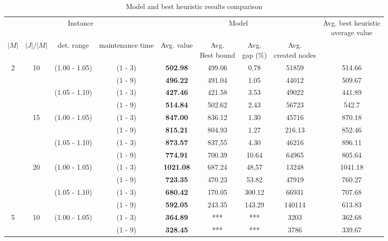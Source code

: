 \documentclass[a4paper,11pt]{article}
\begin{document}
\begin{table}[!ht]
\caption{Model and best heuristic results comparison}
\tiny
\centering
\begin{tabular}{|c|c|c|c|c|c|c |c|c|}
\hline

\multicolumn{4}{|c|}{Instance} & \multicolumn{4}{|c|}{Model}  & \makecell{Avg. best heuristic \\ average value}  \\
\cline{1-8}
$|M|$ & $|J|/|M|$ & det. range & maintenance time & Avg. value& \makecell{Avg.\\ Best bound} & \makecell{Avg. \\gap (\%)} & \makecell {Avg. \\ created nodes} &  \\
\hline

2 & 10 & (1.00 - 1.05) & (1 - 3) & 			  \textbf{502.98}  & 499.06 & 0,78 & 51859 &  514.66 \\
  &    &  & (1 - 9) & 						  \textbf{496.22} & 491.04 & 1.05  & 44012&  509.67 \\
  &    & (1.05 - 1.10) & (1 - 3) & 			  \textbf{427.46} & 421.58 & 3.53 & 49022 &  441.89 \\
  &    &  & (1 - 9) & 						  \textbf{514.84} & 502.62 & 2.43 & 56723 &  542.7 \\
  & 15 & (1.00 - 1.05) & (1 - 3) & 			  \textbf{847.00} & 836.12 & 1.30 & 45716 &  870.18 \\
  &    &               & (1 - 9) & 			  \textbf{815.21} & 804.93 & 1.27 & 216.13 & 852.46 \\
  &    & (1.05 - 1.10) & (1 - 3) &  		  \textbf{873.57} & 837,55 & 4.30 & 46216& 896.11 \\ 
  &    &  & (1 - 9) & 						  \textbf{774.91} & 700.39 & 10.64 & 64965 & 805.64 \\ 
  & 20 & (1.00 - 1.05) & (1 - 3) & 			  \textbf{1021.08} & 687.24 & 48,57 & 13248& 1041.18 \\
  &    &  & (1 - 9) & 						  \textbf{723.35} & 470.23 & 53.82 & 47919& 760.27 \\
  &    & (1.05 - 1.10) & (1 - 3) &  		  \textbf{680.42} & 170.05 & 300.12 & 66931 &  707.68 \\
  &    &  & (1 - 9) & 						  \textbf{592.05} & 243.35 & 143.29 & 140114 &  613.83 \\
5  & 10 & (1.00 - 1.05) & (1 - 3) & 		  \textbf{364.89} & *** & *** & 3203&  362.68 \\
   &    &  & (1 - 9) & 						  \textbf{328.45} & ***  & *** & 3786& 339.67 \\

\end{tabular}
\end{table}
\end{document}
